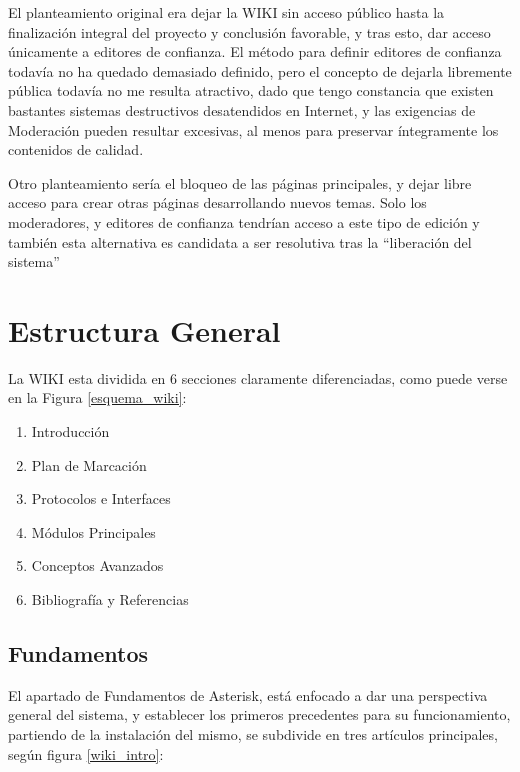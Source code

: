 El planteamiento original era dejar la WIKI sin acceso público hasta la finalización integral del proyecto y conclusión favorable, y tras esto, dar acceso únicamente a editores de confianza. El método para definir editores de confianza todavía no ha quedado demasiado definido, pero el concepto de dejarla libremente pública todavía no me resulta atractivo, dado que tengo constancia que existen bastantes sistemas destructivos desatendidos en Internet, y las exigencias de Moderación pueden resultar excesivas, al menos para preservar íntegramente los contenidos de calidad.

Otro planteamiento sería el bloqueo de las páginas principales, y dejar libre acceso para crear otras páginas desarrollando nuevos temas. Solo los moderadores, y editores de confianza tendrían acceso a este tipo de edición y también esta alternativa es candidata a ser resolutiva tras la ``liberación del sistema''

\section{Estructura General}

La WIKI esta dividida en 6 secciones claramente diferenciadas, como puede verse en la Figura \ref{esquema_wiki}:

\begin{enumerate}
	\item Introducción
	\item Plan de Marcación
	\item Protocolos e Interfaces
	\item Módulos Principales
	\item Conceptos Avanzados
	\item Bibliografía y Referencias
\end{enumerate}


\subsection{Fundamentos}

El apartado de Fundamentos de Asterisk, está enfocado a dar una perspectiva general del sistema, y establecer los primeros precedentes para su funcionamiento, partiendo de la instalación del mismo, se subdivide en tres artículos principales, según figura \ref{wiki_intro}:

